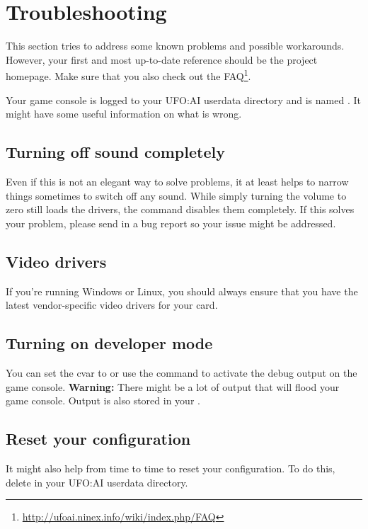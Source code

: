 \section{Troubleshooting}
This section tries to address some known problems and possible workarounds. However, your first and most up-to-date reference should be the project homepage. Make sure that you also check out the FAQ\footnote{\url{http://ufoai.ninex.info/wiki/index.php/FAQ}}.

Your game console is logged to your UFO:AI userdata directory and is named . It might have some useful information on what is wrong. 

\subsection{Turning off sound completely}
Even if this is not an elegant way to solve problems, it at least helps to narrow things sometimes to switch off any sound. While simply turning the volume to zero still loads the drivers, the command   disables them completely. If this solves your problem, please send in a bug report so your issue might be addressed.

\subsection{Video drivers}
If you're running Windows or Linux, you should always ensure that you have the latest vendor-specific video drivers for your card.

\subsection{Turning on developer mode}
You can set the cvar  to  or use the  command to activate the debug output on the game console. \textbf{Warning:} There might be a lot of output that will flood your game console. Output is also stored in your .

\subsection{Reset your configuration}
It might also help from time to time to reset your configuration. To do this, delete  in your UFO:AI userdata directory.